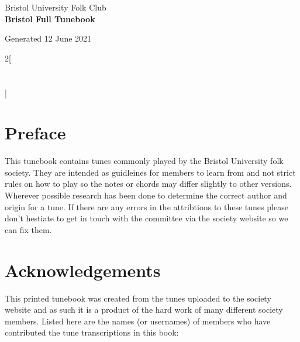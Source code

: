 \documentclass[12pt,a4paper,twoside]{article}
\makeatletter
\newcommand{\thetitle}{Bristol Full Tunebook}
\newcommand{\thedate}{12 June 2021}
\renewcommand\tableofcontents{%
    \begin{multicols}{2}[
      \centering
      \section*{\large\contentsname
        \@mkboth{%
           \MakeUppercase\contentsname}{\MakeUppercase\contentsname}}]
    \@starttoc{toc}%
    \end{multicols}
}
\makeatother
\begin{document}
\begin{titlepage}
   \begin{center}
       \large Bristol University Folk Club \\

       \vspace{4cm}
       \textbf{\Huge \thetitle}

       \vspace{0.5cm}
       Generated \thedate

       \vspace{1.5cm}

       \vfill

   \end{center}
\end{titlepage}

\tableofcontents

\section{Preface}

This tunebook contains tunes commonly played by the Bristol University folk society. They are intended as guidleines for members to learn from and not strict rules on how to play so the notes or chords may differ slightly to other versions.
Wherever possible research has been done to determine the correct author and origin for a tune. If there are any errors in the attribtions to these tunes please don't hestiate to get in touch with the committee via the society website so we can fix them.

\section{Acknowledgements}

This printed tunebook was created from the tunes uploaded to the society website and as such it is a product of the hard work of many different society members. Listed here are the names (or usernames) of members who have contributed the tune transcriptions in this book:
\end{document}
